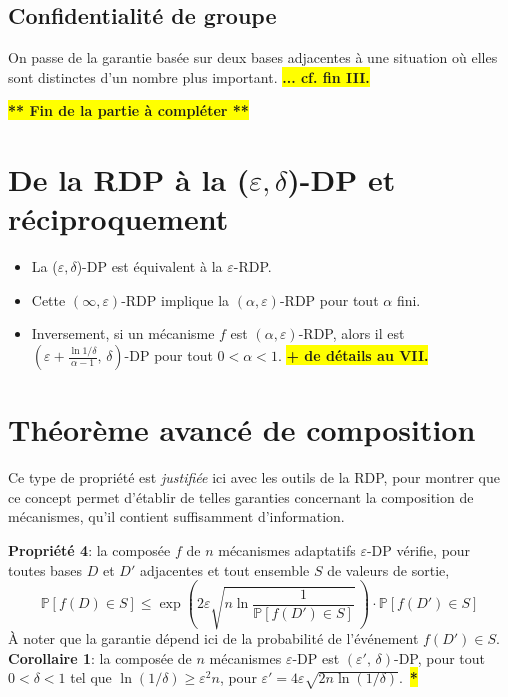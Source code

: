 \documentclass[a4paper,11pt]{article} %
\newcommand{\rem}[1]{\colorbox{yellow}{\textbf{#1}}}
\newcommand{\REM}[1]{\colorbox{yellow}{\color{red}\textbf{#1}}}
\begin{document}
\subsection{Confidentialité de groupe}
On passe de la garantie basée sur deux bases adjacentes à une situation où elles sont distinctes d'un nombre plus important. 
\rem{... cf. fin III.}%

\rem{** Fin de la partie à compléter **}%
\section{De la RDP à la ($\varepsilon, \delta$)-DP et réciproquement}
\begin{itemize}
    \item 
    La ($\varepsilon, \delta$)-DP est équivalent à la $\varepsilon$-RDP. 
    \item 
    Cette $(\infty, \varepsilon)$-RDP implique la $(\alpha, \varepsilon)$-RDP pour tout $\alpha$ fini.
    \item 
    Inversement, si un mécanisme $f$ est $(\alpha, \varepsilon)$-RDP, alors il est\\ $(\varepsilon + \frac{\ln 1/\delta}{\alpha - 1},\, \delta)$-DP pour tout $0<\alpha<1$. \rem{+ de détails au VII.}%
\end{itemize}
\section{Théorème avancé de composition}
Ce type de propriété est \emph{justifiée} ici avec les outils de la RDP, pour montrer que ce concept permet d'établir de telles garanties concernant la composition de mécanismes, qu'il contient suffisamment d'information.

\textbf{Propriété 4}: la composée $f$ de $n$ mécanismes adaptatifs $\varepsilon$-DP vérifie, pour toutes bases $D$ et $D'$ adjacentes et tout ensemble $S$ de valeurs de sortie, 
\[ \mathbb{P}[f(D)\in S] \leqslant \exp \left( 2\varepsilon \sqrt{n \ln \frac {1}{\mathbb{P}[f(D')\in S]}}\, \right)
 \cdot \mathbb{P}[f(D')\in S] \]
\label{dep_proba}À noter que la garantie dépend ici de la probabilité de l'événement $f(D')\in S$.\\[0.4em]

\textbf{Corollaire 1}: la composée de $n$ mécanismes $\varepsilon$-DP est $(\varepsilon',\,\delta)$-DP, pour tout $0<\delta<1$ tel que $\ln(1/\delta) \geqslant \varepsilon^2 n$, pour $\varepsilon' = 4 \varepsilon \sqrt{2n \ln(1/\delta)}$.~\REM{*}%
\end{document}
